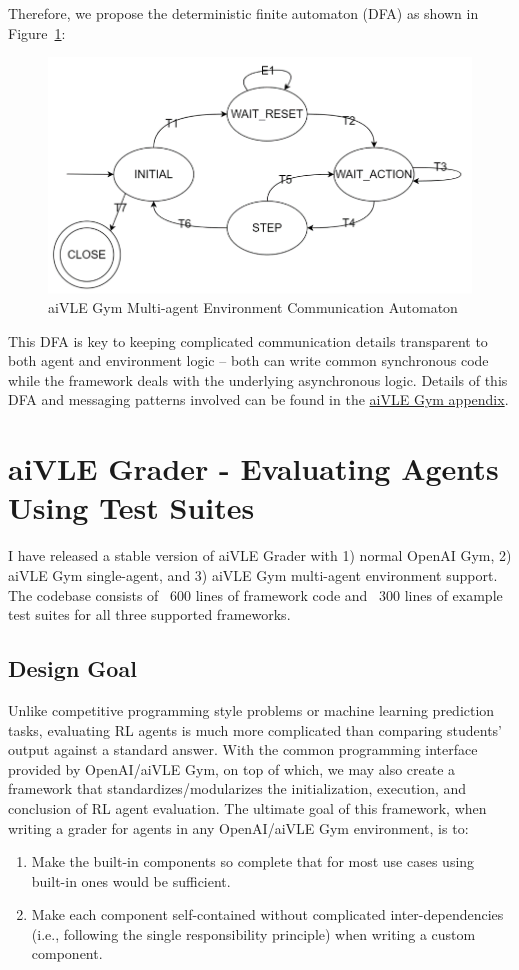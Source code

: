 \documentclass[fyp]{socreport}
\begin{document}
Therefore, we propose the deterministic finite automaton (DFA) as shown in Figure~\ref{fig:aivle-gym-multi-dfa}:
\begin{figure}[H]
    \centering
    \includegraphics{images/aivle-gym-multi-dfa.png}
    \caption{aiVLE Gym Multi-agent Environment Communication Automaton}
    \label{fig:aivle-gym-multi-dfa}
\end{figure}

This DFA is key to keeping complicated communication details transparent to both agent and environment logic – both can write common synchronous code while the framework deals with the underlying asynchronous logic. Details of this DFA and messaging patterns involved can be found in the \href{https://google.com}{aiVLE Gym appendix}.

\section{aiVLE Grader - Evaluating Agents Using Test Suites}
\label{ch:aivle-grader}
I have released a stable version of aiVLE Grader with 1) normal OpenAI Gym, 2) aiVLE Gym single-agent, and 3) aiVLE Gym multi-agent environment support. The codebase consists of ~600 lines of framework code and ~300 lines of example test suites for all three supported frameworks.

\subsection{Design Goal}
Unlike competitive programming style problems or machine learning prediction tasks, evaluating RL agents is much more complicated than comparing students’ output against a standard answer. With the common programming interface provided by OpenAI/aiVLE Gym, on top of which, we may also create a framework that standardizes/modularizes the initialization, execution, and conclusion of RL agent evaluation. The ultimate goal of this framework, when writing a grader for agents in any OpenAI/aiVLE Gym environment, is to:
\begin{enumerate}
    \item Make the built-in components so complete that for most use cases using built-in ones would be sufficient.
    \item Make each component self-contained without complicated inter-dependencies (i.e., following the single responsibility principle) when writing a custom component.
\end{enumerate}
\end{document}
